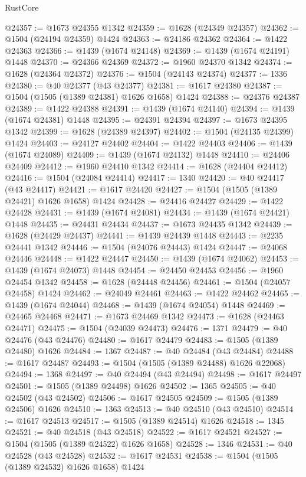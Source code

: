 \begin{lexlean}{RustCore}
\begin{coremodule}
@24357 := @1673 @24355 @1342
@24359 := @1628 (@24349 @24357)
@24362 := @1504 (@24194 @24359) @1424
@24363 := @24186 @24362
@24364 := @1422 @24363
@24366 := @1439 (@1674 @24148)
@24369 := @1439 (@1674 @24191) @1448
@24370 := @24366 @24369
@24372 := @1960 @24370 @1342
@24374 := @1628 (@24364 @24372)
@24376 := @1504 (@24143 @24374)
@24377 := 1336
@24380 := @40 @24377 (@43 @24377)
@24381 := @1617 @24380
@24387 := @1504 (@1505 (@1389 @24381) @1626 @1658) @1424
@24388 := @24376 @24387
@24389 := @1422 @24388
@24391 := @1439 (@1674 @24140)
@24394 := @1439 (@1674 @24381) @1448
@24395 := @24391 @24394
@24397 := @1673 @24395 @1342
@24399 := @1628 (@24389 @24397)
@24402 := @1504 (@24135 @24399) @1424
@24403 := @24127 @24402
@24404 := @1422 @24403
@24406 := @1439 (@1674 @24089)
@24409 := @1439 (@1674 @24132) @1448
@24410 := @24406 @24409
@24412 := @1960 @24410 @1342
@24414 := @1628 (@24404 @24412)
@24416 := @1504 (@24084 @24414)
@24417 := 1340
@24420 := @40 @24417 (@43 @24417)
@24421 := @1617 @24420
@24427 := @1504 (@1505 (@1389 @24421) @1626 @1658) @1424
@24428 := @24416 @24427
@24429 := @1422 @24428
@24431 := @1439 (@1674 @24081)
@24434 := @1439 (@1674 @24421) @1448
@24435 := @24431 @24434
@24437 := @1673 @24435 @1342
@24439 := @1628 (@24429 @24437)
@24441 := @1439 @24439 @1448
@24443 := @2235 @24441 @1342
@24446 := @1504 (@24076 @24443) @1424
@24447 := @24068 @24446
@24448 := @1422 @24447
@24450 := @1439 (@1674 @24062)
@24453 := @1439 (@1674 @24073) @1448
@24454 := @24450 @24453
@24456 := @1960 @24454 @1342
@24458 := @1628 (@24448 @24456)
@24461 := @1504 (@24057 @24458) @1424
@24462 := @24049 @24461
@24463 := @1422 @24462
@24465 := @1439 (@1674 @24044)
@24468 := @1439 (@1674 @24054) @1448
@24469 := @24465 @24468
@24471 := @1673 @24469 @1342
@24473 := @1628 (@24463 @24471)
@24475 := @1504 (@24039 @24473)
@24476 := 1371
@24479 := @40 @24476 (@43 @24476)
@24480 := @1617 @24479
@24483 := @1505 (@1389 @24480) @1626
@24484 := 1367
@24487 := @40 @24484 (@43 @24484)
@24488 := @1617 @24487
@24493 := @1504 (@1505 (@1389 @24488) @1626 @22068)
@24494 := 1368
@24497 := @40 @24494 (@43 @24494)
@24498 := @1617 @24497
@24501 := @1505 (@1389 @24498) @1626
@24502 := 1365
@24505 := @40 @24502 (@43 @24502)
@24506 := @1617 @24505
@24509 := @1505 (@1389 @24506) @1626
@24510 := 1363
@24513 := @40 @24510 (@43 @24510)
@24514 := @1617 @24513
@24517 := @1505 (@1389 @24514) @1626
@24518 := 1345
@24521 := @40 @24518 (@43 @24518)
@24522 := @1617 @24521
@24527 := @1504 (@1505 (@1389 @24522) @1626 @1658)
@24528 := 1346
@24531 := @40 @24528 (@43 @24528)
@24532 := @1617 @24531
@24538 := @1504 (@1505 (@1389 @24532) @1626 @1658) @1424

\end{coremodule}
\end{lexlean}
